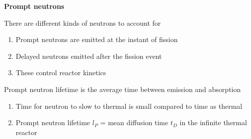 \documentclass[aspectratio=1610,pdftex,dvipsnames,compress,xcolor={dvipsnames}]{beamer}
\begin{document}
\begin{frame}[plain]{}
    \centering\LARGE\textbf{Prompt neutrons}
\end{frame}


\addtocounter{framenumber}{-1} 
\begin{frame}{There are different kinds of neutrons to account for}
    \begin{enumerate}[series=outerlist,topsep=0pt,itemsep=21pt,leftmargin=*,label=(\arabic*)]
        \item[]Prompt neutrons are emitted at the instant of fission
        \item[]Delayed neutrons emitted after the fission event
        \item[]These control reactor kinetics
    \end{enumerate}
\end{frame}


\begin{frame}{Prompt neutron lifetime is the average time between emission and absorption}
    \begin{enumerate}[series=outerlist,topsep=0pt,itemsep=21pt,leftmargin=*,label=(\arabic*)]
        \item[]Time for neutron to slow to thermal is small compared to time as thermal
        \item[]Prompt neutron lifetime $l_P$ = mean diffusion time $t_D$ in the infinite thermal reactor
    \end{enumerate}
\end{frame}
\end{document}
